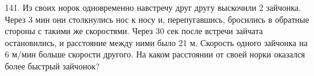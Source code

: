 141. Из своих норок одновременно навстречу друг другу выскочили 2 зайчонка. Через 3 мин они столкнулись нос к носу и, перепугавшись, бросились в обратные стороны с такими же скоростями. Через 30 сек после встречи зайчата остановились, и расстояние между ними было 21 м. Скорость одного зайчонка на 6 м/мин больше скорости другого. На каком расстоянии от своей норки оказался более быстрый зайчонок?\\
